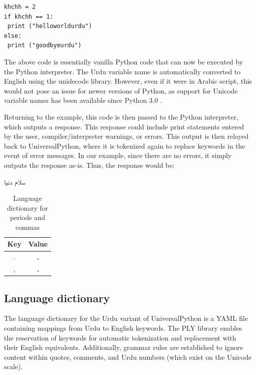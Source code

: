 \documentclass[conference]{IEEEtran}
\begin{document}
\begin{lstlisting}
khchh = 2
if khchh == 1:
 print ("helloworldurdu")
else:
 print ("goodbyeurdu")
\end{lstlisting}

The above code is essentially vanilla Python code that can now be executed by the Python interpreter. The Urdu variable name is automatically converted to English using the unidecode library. However, even if it were in Arabic script, this would not pose an issue for newer versions of Python, as support for Unicode variable names has been available since Python 3.0 \cite{coghlan2014transition}.

Returning to the example, this code is then passed to the Python interpreter, which outputs a response. This response could include print statements entered by the user, compiler/interpreter warnings, or errors. This output is then relayed back to UniversalPython, where it is tokenized again to replace keywords in the event of error messages. In our example, since there are no errors, it simply outputs the response as-is. Thus, the response would be:

\begin{urdu} %
\urdufont 
سلام دنیا

\end{urdu} %
  
\begin{table}[h]
\centering
\caption{Language dictionary for periods and commas}
\label{tab:language_dictionary}
\vspace{3mm}
\begin{tabular}{cc}
\hline
Key & Value \\
\hline
. & \texturdu{۔} \\
, & \texturdu{،} \\
\hline
\end{tabular}
\end{table}

\subsection{Language dictionary}

The language dictionary for the Urdu variant of UniversalPython is a YAML file containing mappings from Urdu to English keywords. The PLY library enables the reservation of keywords for automatic tokenization and replacement with their English equivalents. Additionally, grammar rules are established to ignore content within quotes, comments, and Urdu numbers (which exist on the Unicode scale).
\end{document}
